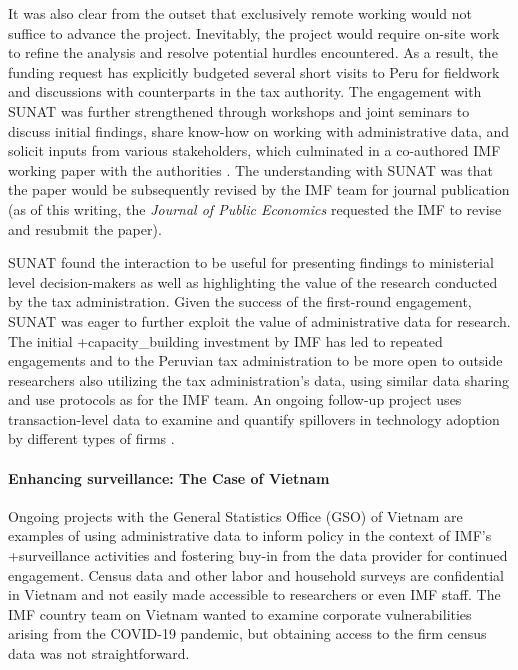 \documentclass[
]{WileySix}
\begin{document}
It was also clear from the outset that exclusively remote working would not suffice to advance the project. Inevitably, the project would require on-site work to refine the analysis and resolve potential hurdles encountered. As a result, the funding request has explicitly budgeted several short visits to Peru for fieldwork and discussions with counterparts in the tax authority. The engagement with SUNAT was further strengthened through workshops and joint seminars to discuss initial findings, share know-how on working with administrative data, and solicit inputs from various stakeholders, which culminated in a co-authored IMF working paper with the authorities \citep{bellon2019}. The understanding with SUNAT was that the paper would be subsequently revised by the IMF team for journal publication (as of this writing, the \emph{Journal of Public Economics} requested the IMF to revise and resubmit the paper).

SUNAT found the interaction to be useful for presenting findings to ministerial level decision-makers as well as highlighting the value of the research conducted by the tax administration. Given the success of the first-round engagement, SUNAT was eager to further exploit the value of administrative data for research. The initial +capacity\_building\textbar{} investment by IMF has led to repeated engagements and to the Peruvian tax administration to be more open to outside researchers also utilizing the tax administration's data, using similar data sharing and use protocols as for the IMF team. An ongoing follow-up project uses transaction-level data to examine and quantify spillovers in technology adoption by different types of firms \citep{holtsmark2020}.

\hypertarget{enhancing-surveillance-the-case-of-vietnam}{%
\paragraph{Enhancing surveillance: The Case of Vietnam}\label{enhancing-surveillance-the-case-of-vietnam}}

Ongoing projects with the General Statistics Office (GSO) of Vietnam are examples of using administrative data to inform policy in the context of IMF's +surveillance\textbar{} activities and fostering buy-in from the data provider for continued engagement. Census data and other labor and household surveys are confidential in Vietnam and not easily made accessible to researchers or even IMF staff. The IMF country team on Vietnam wanted to examine corporate vulnerabilities arising from the COVID-19 pandemic, but obtaining access to the firm census data was not straightforward.
\end{document}
